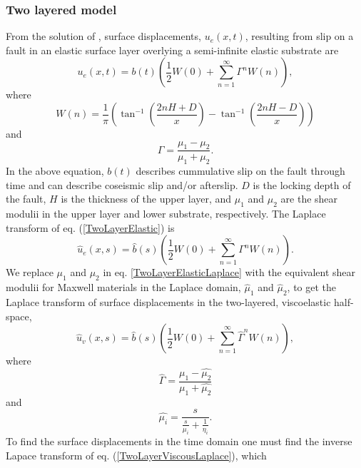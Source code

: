 \documentclass[extra]{gji}
\begin{document}
\subsubsection{Two layered model}
From the solution of \citet{R1971}, surface displacements,
$u_{e}(x,t)$, resulting from slip on a fault in an elastic surface
layer overlying a semi-infinite elastic substrate are
\begin{equation}\label{TwoLayerElastic}
  u_{e}(x,t) = b(t)\left(\frac{1}{2} W(0) + 
    \sum_{n=1}^\infty \Gamma^nW(n)\right),
\end{equation}
where
\begin{equation}
  W(n) = \frac{1}{\pi}\left(\tan^{-1}\left(\frac{2nH + D}{x}\right) 
    - \tan^{-1}\left(\frac{2nH - D}{x}\right)\right)
\end{equation}
and
\begin{equation}
  \Gamma = \frac{\mu_1 - \mu_2}{\mu_1 + \mu_2}.
\end{equation}
In the above equation, $b(t)$ describes cummulative slip on the fault
through time and can describe coseismic slip and/or afterslip. $D$ is
the locking depth of the fault, $H$ is the thickness of the upper
layer, and $\mu_1$ and $\mu_2$ are the shear modulii in the upper
layer and lower substrate, respectively.  The Laplace transform of
eq. (\ref{TwoLayerElastic}) is
\begin{equation}\label{TwoLayerElasticLaplace}
 \hat{u}_e(x,s) = \hat{b}(s)\left(\frac{1}{2} W(0) +\sum_{n=1}^\infty\Gamma^nW(n)\right).
\end{equation}
We replace $\mu_1$ and $\mu_2$ in eq. \ref{TwoLayerElasticLaplace}
with the equivalent shear modulii for Maxwell materials in the Laplace
domain, $\hat{\mu}_1$ and $\hat{\mu}_2$, to get the Laplace
transform of surface displacements in the two-layered, viscoelastic
half-space,
\begin{equation}\label{TwoLayerViscousLaplace}
 \hat{u}_v(x,s) = \hat{b}(s)\left(\frac{1}{2}W(0) +\sum_{n=1}^\infty\hat{\Gamma}^nW(n)\right),
\end{equation}
where
\begin{equation}
  \hat{\Gamma} = \frac{\hat{\mu_1} - \hat{\mu_2}}{\hat{\mu_1} + \hat{\mu_2}}
\end{equation}
and
\begin{equation}
  \hat{\mu_i} = \frac{s}{\frac{s}{\mu_i} + \frac{1}{\eta_i}}.
\end{equation}
To find the surface displacements in the time domain one must find the
inverse Lapace transform of eq. (\ref{TwoLayerViscousLaplace}), which
\end{document}
